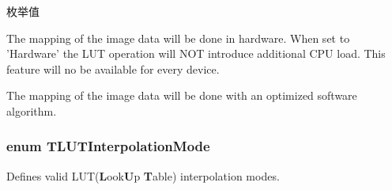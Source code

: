 \begin{Desc}
\item[枚举值]\par
\begin{description}
\item[{\em 
\hypertarget{group___common_interface_gga7ba807ea2d27f199703d303b0901e243a18d657c7fbed42de8199c47ff10687aa}{L\+U\+Ti\+Hardware}\label{group___common_interface_gga7ba807ea2d27f199703d303b0901e243a18d657c7fbed42de8199c47ff10687aa}
}]The mapping of the image data will be done in hardware. When set to 'Hardware' the L\+U\+T operation will N\+O\+T introduce additional C\+P\+U load. This feature will no be available for every device. \item[{\em 
\hypertarget{group___common_interface_gga7ba807ea2d27f199703d303b0901e243aa4a71a15110d6d354923aa6ecae1998f}{L\+U\+Ti\+Software}\label{group___common_interface_gga7ba807ea2d27f199703d303b0901e243aa4a71a15110d6d354923aa6ecae1998f}
}]The mapping of the image data will be done with an optimized software algorithm. \end{description}
\end{Desc}
\hypertarget{group___common_interface_ga40d5450344b3aaaf127544ef3985cfbb}{
\subsubsection[{T\+L\+U\+T\+Interpolation\+Mode}]{\setlength{\rightskip}{0pt plus 5cm}enum {\bf T\+L\+U\+T\+Interpolation\+Mode}}}\label{group___common_interface_ga40d5450344b3aaaf127544ef3985cfbb}


Defines valid L\+U\+T({\bfseries L}ook{\bfseries U}p {\bfseries T}able) interpolation modes. 

